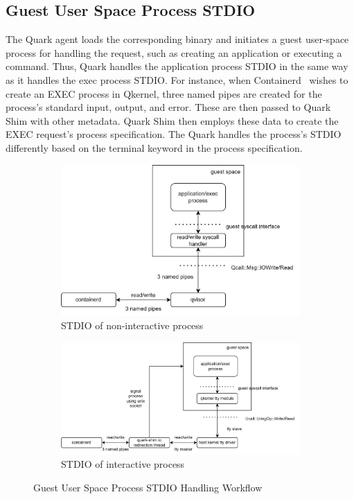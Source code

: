 \subsection{Guest User Space Process STDIO}
\label{sec:security_analyse_STDIO}

The Quark agent loads the corresponding binary and initiates a guest user-space process for handling the request, such as creating an application or executing a command. Thus, Quark handles the application process STDIO in the same way as it handles the exec process STDIO. For instance, when Containerd~\cite*{containerd} wishes to create an EXEC process in Qkernel, 
three named pipes are created for the process's standard input, output, and error. These are then passed to Quark Shim with other metadata. Quark Shim then employs these data to create the EXEC request's process specification. The Quark handles the process's STDIO differently based on the terminal keyword in the process specification.


\begin{figure}[ht] 
    \begin{subfigure}[b]{0.5\linewidth}
      \centering
      \includegraphics[width=0.9\linewidth]{images/normorl_io.png} 
      \caption{STDIO of non-interactive process} 
      \label{fig1:a} 
      \vspace{4ex}
    \end{subfigure}%
    \begin{subfigure}[b]{0.5\linewidth}
      \centering
      \includegraphics[width=0.9\linewidth]{images/termianl_workflow.png} 
      \caption{STDIO of interactive process} 
      \label{fig1:b} 
      \vspace{4ex}
    \end{subfigure} 
    \caption{Guest User Space Process STDIO Handling Workflow}
    \label{fig1} 
\end{figure}


